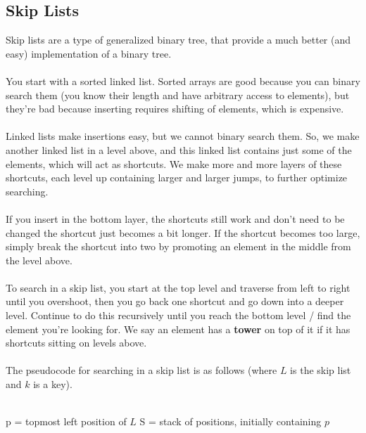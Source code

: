 \documentclass[]{article}
\theoremstyle{definition}
\newcommand{\lecture}[1]{\marginpar{{\footnotesize $\leftarrow$ \underline{#1}}}}
\begin{document}
		\subsection{Skip Lists}
			Skip lists are a type of generalized binary tree, that provide a much better (and easy) implementation of a binary tree.
			\\ \\
			You start with a sorted linked list. Sorted arrays are good because you can binary search them (you know their length and have arbitrary access to elements), but they're bad because inserting requires shifting of elements, which is expensive.
			\\ \\
			Linked lists make insertions easy, but we cannot binary search them. So, we make another linked list in a level above, and this linked list contains just some of the elements, which will act as shortcuts. We make more and more layers of these shortcuts, each level up containing larger and larger jumps, to further optimize searching.
			\\ \\
			If you insert in the bottom layer, the shortcuts still work and don't need to be changed \textendash{} the shortcut just becomes a bit longer. If the shortcut becomes too large, simply break the shortcut into two by promoting an element in the middle from the level above. \lecture{March 12, 2013}
			\\ \\
			To search in a skip list, you start at the top level and traverse from left to right until you overshoot, then you go back one shortcut and go down into a deeper level. Continue to do this recursively until you reach the bottom level / find the element you're looking for. We say an element has a \textbf{tower} on top of it if it has shortcuts sitting on levels above.
			\\ \\
			The pseudocode for searching in a skip list is as follows (where $L$ is the skip list and $k$ is a key). \\ \\
			\begin{algorithm}[H]
				p = topmost left position of $L$\;
				S = stack of positions, initially containing $p$\;
			\end{algorithm}
\end{document}
